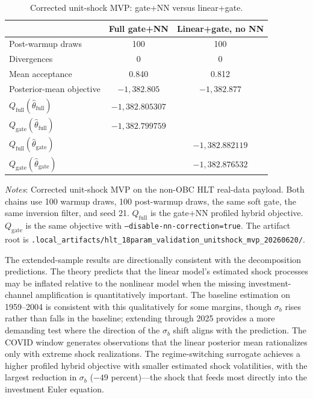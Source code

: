 \documentclass[12pt]{article}
\theoremstyle{plain}
\theoremstyle{definition}
\theoremstyle{remark}
\newcommand{\tablenotes}[1]{%
  \par\vspace{0.5em}%
  \noindent\begin{minipage}{\textwidth}%
  \raggedright\footnotesize #1%
  \end{minipage}\par%
}
\begin{document}
\begin{table}[htbp]
\centering
\caption{Corrected unit-shock MVP: gate+NN versus linear+gate.}
\label{tab:linear_gate_ablation}
\begin{tabular}{lcc}
\toprule
& Full gate+NN & Linear+gate, no NN \\
\midrule
Post-warmup draws & 100 & 100 \\
Divergences & 0 & 0 \\
Mean acceptance & 0.840 & 0.812 \\
Posterior-mean objective & $-1{,}382.805$ & $-1{,}382.877$ \\
\midrule
$Q_{\text{full}}(\hat{\theta}_{\text{full}})$ & $-1{,}382.805307$ &  \\
$Q_{\text{gate}}(\hat{\theta}_{\text{full}})$ & $-1{,}382.799759$ &  \\
$Q_{\text{full}}(\hat{\theta}_{\text{gate}})$ &  & $-1{,}382.882119$ \\
$Q_{\text{gate}}(\hat{\theta}_{\text{gate}})$ &  & $-1{,}382.876532$ \\
\bottomrule
\end{tabular}
\smallskip
\tablenotes{\textit{Notes}: Corrected unit-shock MVP on the non-OBC HLT real-data payload. Both chains use 100 warmup draws, 100 post-warmup draws, the same soft gate, the same inversion filter, and seed 21. \(Q_{\text{full}}\) is the gate+NN profiled hybrid objective. \(Q_{\text{gate}}\) is the same objective with \texttt{--disable-nn-correction=true}. The artifact root is \texttt{.local\_artifacts/hlt\_18param\_validation\_unitshock\_mvp\_20260620/}.}
\end{table}

The extended-sample results are directionally consistent with the decomposition predictions. The theory predicts that the linear model's estimated shock processes may be inflated relative to the nonlinear model when the missing investment-channel amplification is quantitatively important. The baseline estimation on 1959--2004 is consistent with this qualitatively for some margins, though $\sigma_b$ rises rather than falls in the baseline; extending through 2025 provides a more demanding test where the direction of the $\sigma_b$ shift aligns with the prediction. The COVID window generates observations that the linear posterior mean rationalizes only with extreme shock realizations. The regime-switching surrogate achieves a higher profiled hybrid objective with smaller estimated shock volatilities, with the largest reduction in $\sigma_b$ ($-49$ percent)---the shock that feeds most directly into the investment Euler equation.
\end{document}
